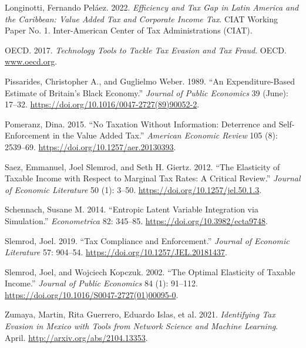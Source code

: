 \documentclass[
  12pt]{article}
\newlength{\cslhangindent}
\newenvironment{CSLReferences}[2] %
 {\begin{list}{}{%
  \setlength{\itemindent}{0pt}
  \setlength{\leftmargin}{0pt}
  \setlength{\parsep}{0pt}
  \ifodd #1
   \setlength{\leftmargin}{\cslhangindent}
   \setlength{\itemindent}{-1\cslhangindent}
  \fi
  \setlength{\itemsep}{#2\baselineskip}}}
 {\end{list}}
\begin{document}
\begin{CSLReferences}{1}{1}
Longinotti, Fernando Peláez. 2022. \emph{Efficiency and Tax Gap in
{Latin America} and the {Caribbean}: Value Added Tax and Corporate
Income Tax}. CIAT Working Paper No. 1. Inter-American Center of Tax
Administrations (CIAT).

OECD. 2017. \emph{Technology Tools to Tackle Tax Evasion and Tax Fraud}.
OECD. \href{https://www.oecd.org}{www.oecd.org}.

Pissarides, Christopher A., and Guglielmo Weber. 1989. {``An
Expenditure-Based Estimate of Britain's Black Economy.''} \emph{Journal
of Public Economics} 39 (June): 17--32.
\url{https://doi.org/10.1016/0047-2727(89)90052-2}.

Pomeranz, Dina. 2015. {``No Taxation Without Information: Deterrence and
Self-Enforcement in the Value Added Tax.''} \emph{American Economic
Review} 105 (8): 2539--69. \url{https://doi.org/10.1257/aer.20130393}.

Saez, Emmanuel, Joel Slemrod, and Seth H. Giertz. 2012. {``The
Elasticity of Taxable Income with Respect to Marginal Tax Rates: A
Critical Review.''} \emph{Journal of Economic Literature} 50 (1): 3--50.
\url{https://doi.org/10.1257/jel.50.1.3}.

Schennach, Susane M. 2014. {``Entropic Latent Variable Integration via
Simulation.''} \emph{Econometrica} 82: 345--85.
\url{https://doi.org/10.3982/ecta9748}.

Slemrod, Joel. 2019. {``Tax Compliance and Enforcement.''} \emph{Journal
of Economic Literature} 57: 904--54.
\url{https://doi.org/10.1257/JEL.20181437}.

Slemrod, Joel, and Wojciech Kopczuk. 2002. {``The Optimal Elasticity of
Taxable Income.''} \emph{Journal of Public Economics} 84 (1): 91--112.
\url{https://doi.org/10.1016/S0047-2727(01)00095-0}.

Zumaya, Martin, Rita Guerrero, Eduardo Islas, et al. 2021.
\emph{Identifying Tax Evasion in Mexico with Tools from Network Science
and Machine Learning}. April. \url{http://arxiv.org/abs/2104.13353}.

\end{CSLReferences}
\end{document}
